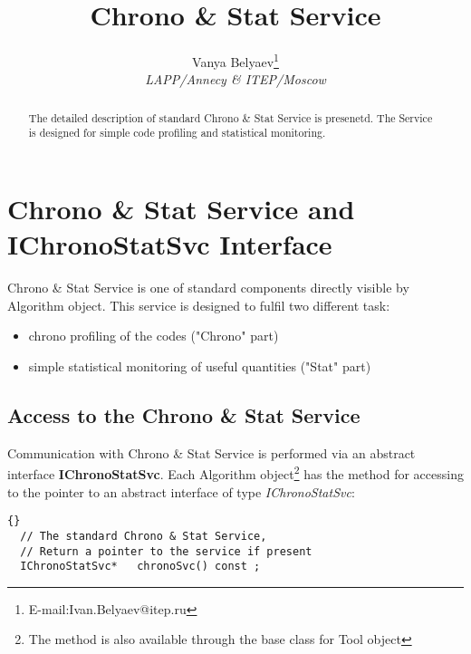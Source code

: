 \documentclass{lhcbnote}
\newcommand{\bftt}         {\ttfamily\bfseries}
\renewcommand{\it}         {\itshape}
\renewcommand{\tt}         {\ttfamily}
\begin{document}
\lstset{language=[ANSI]C++}
\lstset{indent=15mm}
\lstset{labelstep=1}
\lstset{labelstyle=\tt\tiny}

\docmod{\today}


                
\title{Chrono \& Stat Service}
\author{Vanya Belyaev\footnote{E-mail:{\tt Ivan.Belyaev@itep.ru}} \\ 
  {\it LAPP/Annecy \& ITEP/Moscow}}
\maketitle 

\begin{abstract}
The detailed description of standard Chrono \& Stat Service
is presenetd. The Service is designed for simple code profiling 
and statistical monitoring.
\end{abstract}

\tableofcontents 

\chapter{Chrono \& Stat Service and {\bftt{IChronoStatSvc}}  Interface}  

Chrono \& Stat Service is one of standard components directly 
visible by Algorithm object. 
This service is designed to fulfil two different task:

\begin{itemize}
 \item chrono profiling  of  the  codes  ("Chrono" part)  
 \item simple statistical monitoring of useful quantities ("Stat" part)  
\end{itemize} 

\section{Access to the Chrono \& Stat Service}  
Communication with Chrono \& Stat Service is performed via an 
abstract  interface {\bftt{IChronoStatSvc}}.  
Each Algorithm object\footnote{The method is also available 
  through the base class {\tt{GaudiTool}} for Tool object}  has the 
method for accessing to the pointer to an abstract interface of type 
{\it IChronoStatSvc}:  

\begin{lstlisting}{}
  // The standard Chrono & Stat Service, 
  // Return a pointer to the service if present 
  IChronoStatSvc*   chronoSvc() const ; 
\end{lstlisting} 
\end{document}
